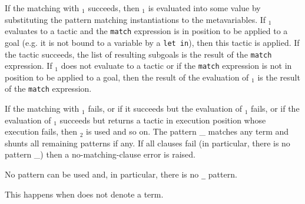 If the matching with {\cpattern}$_1$ succeeds, then {\tacexpr}$_1$ is
evaluated into some value by substituting the pattern matching
instantiations to the metavariables. If {\tacexpr}$_1$ evaluates to a
tactic and the {\tt match} expression is in position to be applied to
a goal (e.g. it is not bound to a variable by a {\tt let in}), then
this tactic is applied. If the tactic succeeds, the list of resulting
subgoals is the result of the {\tt match} expression. If
{\tacexpr}$_1$ does not evaluate to a tactic or if the {\tt match}
expression is not in position to be applied to a goal, then the result
of the evaluation of {\tacexpr}$_1$ is the result of the {\tt match}
expression.

If the matching with {\cpattern}$_1$ fails, or if it succeeds but the
evaluation of {\tacexpr}$_1$ fails, or if the evaluation of
{\tacexpr}$_1$ succeeds but returns a tactic in execution position
whose execution fails, then {\cpattern}$_2$ is used and so on.  The
pattern {\_} matches any term and shunts all remaining patterns if
any. If all clauses fail (in particular, there is no pattern {\_})
then a no-matching-clause error is raised.

\begin{ErrMsgs}

\item {}

  No pattern can be used and, in particular, there is no {\tt \_} pattern.

\item {}

  This happens when {\tacexpr} does not denote a term.

\end{ErrMsgs}

